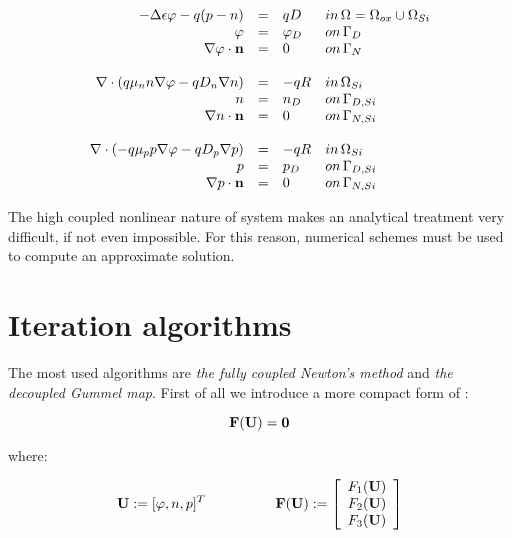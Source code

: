 \begin{equation}
\label{eq: system closed}
\begin{array}{rcll}
- \Delta \epsilon \varphi - q(p-n) & =  & qD & in \, \Omega = \Omega_{ox} \cup \Omega_{Si}\\
\varphi & = & \varphi_D & on \, \Gamma_D \\
\nabla \varphi \cdot \mathbf{n} & = & 0 & on \, \Gamma_N 
\\
\\
\nabla \cdot ( q\mu_n n \nabla \varphi - qD_n \nabla n ) & = & - qR & in \, \Omega_{Si}\\
n & = & n_D & on \, \Gamma_{D,Si} \\
\nabla n \cdot \mathbf{n} & = & 0 & on \, \Gamma_{N,Si}
\\
\\
\nabla \cdot (- q\mu_p p \nabla \varphi - qD_p \nabla p )& = & -qR& in \, \Omega_{Si}\\
p & = & p_D & on \, \Gamma_{D,Si} \\
\nabla p \cdot \mathbf{n} & = & 0 & on \, \Gamma_{N,Si}
\end{array}
\end{equation}

The high coupled nonlinear nature of system	 makes an analytical treatment very difficult, if not even impossible. For this reason, numerical schemes must be used to compute an approximate solution. 


\section{Iteration algorithms}

 The most used algorithms are \textit{the fully coupled Newton's method} and \textit{the decoupled Gummel map}. First of all we introduce a more compact form of :

\begin{equation}
\label{eq: abstract problem fully}
\mathbf{F(U)}=\mathbf{0}
\end{equation}

where:

\begin{equation}
\label{eq: functional operator}
\vect{U}:=[\varphi,n,p]^T \psp{30} \vect{F(U)}:=\left[ \begin{array}{c}
F_1(\vect{U}) \\
F_2(\vect{U}) \\
F_3(\vect{U})
\end{array}
\right]
\end{equation}

